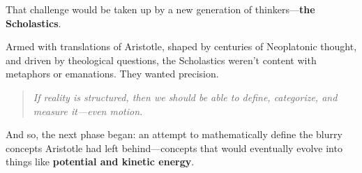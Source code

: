 That challenge would be taken up by a new generation of thinkers—\textbf{the Scholastics}.

Armed with translations of Aristotle, shaped by centuries of Neoplatonic thought, and driven by theological questions, the Scholastics weren’t content with metaphors or emanations. They wanted precision.

\begin{quote}
    \textit{If reality is structured, then we should be able to define, categorize, and measure it—even motion.}
\end{quote}

And so, the next phase began: an attempt to mathematically define the blurry concepts Aristotle had left behind—concepts that would eventually evolve into things like \textbf{potential and kinetic energy}.
